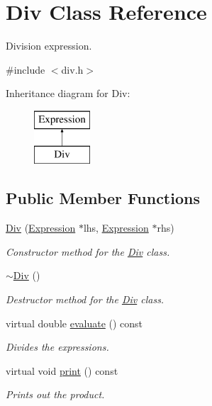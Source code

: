 \hypertarget{class_div}{}\section{Div Class Reference}
\label{class_div}


Division expression.  




{\ttfamily \#include $<$div.\+h$>$}

Inheritance diagram for Div\+:\begin{figure}[H]
\begin{center}
\leavevmode
\includegraphics[height=2.000000cm]{class_div}
\end{center}
\end{figure}
\subsection*{Public Member Functions}
\begin{DoxyCompactItemize}
\item 
\hyperlink{class_div_a09066be0ef1596f1f673fe7a072cdc2d}{Div} (\hyperlink{class_expression}{Expression} $\ast$lhs, \hyperlink{class_expression}{Expression} $\ast$rhs)
\begin{DoxyCompactList}\small\item\em Constructor method for the \hyperlink{class_div}{Div} class. \end{DoxyCompactList}\item 
\hyperlink{class_div_ad4e297304eb13dfd034c9e0459ecfc4d}{$\sim$\+Div} ()
\begin{DoxyCompactList}\small\item\em Destructor method for the \hyperlink{class_div}{Div} class. \end{DoxyCompactList}\item 
virtual double \hyperlink{class_div_a5b96e19e7cffdb205a9e56377be3652e}{evaluate} () const
\begin{DoxyCompactList}\small\item\em Divides the expressions. \end{DoxyCompactList}\item 
virtual void \hyperlink{class_div_acbcc6e3d0f3ccb5e74de28de8499cbbf}{print} () const
\begin{DoxyCompactList}\small\item\em Prints out the product. \end{DoxyCompactList}\end{DoxyCompactItemize}


